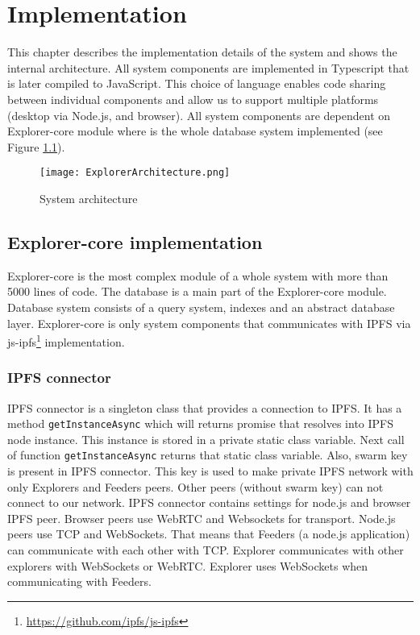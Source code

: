 \chapter{Implementation}
\label{Implementation}
This chapter describes the implementation details of the system and shows the internal architecture. All system components are implemented in Typescript that is later compiled to JavaScript. This choice of language enables code sharing between individual components and allow us to support multiple platforms (desktop via Node.js, and browser). All system components are dependent on Explorer-core module where is the whole database system implemented (see Figure \ref{systemArchitecture}). 


\begin{figure}[h]
    \centering
    \texttt{[image: ExplorerArchitecture.png]}
    \caption{System architecture}
    \label{systemArchitecture}
\end{figure}


\section{Explorer-core implementation}
Explorer-core is the most complex module of a whole system with more than 5000 lines of code. The database is a main part of the Explorer-core module. Database system consists of a query system, indexes and an abstract database layer. Explorer-core is only system components that communicates with IPFS via js-ipfs\footnote{\url{https://github.com/ipfs/js-ipfs}} implementation.

\subsection{IPFS connector}
IPFS connector is a singleton class that provides a connection to IPFS. It has a method \texttt{getInstanceAsync} which will returns promise that resolves into IPFS node instance. This instance is stored in a private static class variable. Next call of function \texttt{getInstanceAsync} returns that static class variable.
Also, swarm key is present in IPFS connector. This key is used to make private IPFS network with only Explorers and Feeders peers. Other peers (without swarm key) can not connect to our network. IPFS connector contains settings for node.js and browser IPFS peer. Browser peers use WebRTC and Websockets for transport. Node.js peers use TCP and WebSockets. That means that Feeders (a node.js application) can communicate with each other with TCP. Explorer communicates with other explorers with WebSockets or WebRTC. Explorer uses WebSockets when communicating with Feeders.

